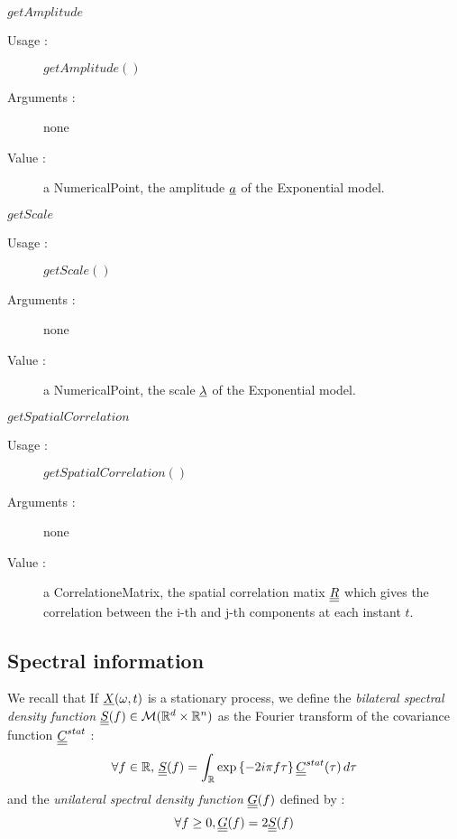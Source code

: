 \begin{description}
\item[Some methods :]  \rule{0pt}{1em}

  \begin{description}

     \item $getAmplitude$
    \begin{description}
    \item[Usage :] $getAmplitude()$
    \item[Arguments :] none
    \item[Value :]   a NumericalPoint, the amplitude ${\underline{a}}$ of the Exponential model.
    \end{description}
    \bigskip

    \item $getScale$
    \begin{description}
    \item[Usage :] $getScale()$
    \item[Arguments :] none
    \item[Value :]   a NumericalPoint, the scale ${\underline{\lambda}}$ of the Exponential model.
    \end{description}
    \bigskip

    \item $getSpatialCorrelation$
    \begin{description}
    \item[Usage :] $getSpatialCorrelation()$
    \item[Arguments :] none
    \item[Value :]   a CorrelationeMatrix, the spatial correlation matix ${\underline{\underline{R}}}$ which gives the correlation between the i-th and j-th components at each instant $t$. 
    \end{description}
    \bigskip

  \end{description}

\end{description}

 
\newpage \subsection{Spectral information}



We recall that If ${\underline{X}}(\omega,t)$  is a stationary process, we  define the \emph{ bilateral spectral density function} ${\underline{\underline{S}}}(f) \in \mathcal{M}(\mathbb{R}^d \times \mathbb{R}^n)$ as the Fourier transform of the covariance function ${\underline{\underline{C}}}^{stat}$ :
\begin{equation} \label{specdensFunc}
  \forall f \in \mathbb{R}, \, {\underline{\underline{S}}}(f) = \int_{\mathbb{R}}\exp\left\{  -2i\pi f \tau \right\} {\underline{\underline{C}}}^{stat}(\tau)\, d\tau
\end{equation}
and the  \emph{ unilateral spectral density function} ${\underline{\underline{G}}}(f)$ defined by : 
\begin{equation}\label{univG}
  \forall f \geq 0, {\underline{\underline{G}}}(f) = 2{\underline{\underline{S}}}(f)
\end{equation}

